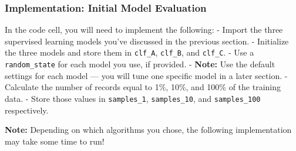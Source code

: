 \documentclass[11pt]{article}
\begin{document}
    \hypertarget{implementation-initial-model-evaluation}{%
\subsubsection{Implementation: Initial Model
Evaluation}\label{implementation-initial-model-evaluation}}

In the code cell, you will need to implement the following: - Import the
three supervised learning models you've discussed in the previous
section. - Initialize the three models and store them in
\texttt{\textquotesingle{}clf\_A\textquotesingle{}},
\texttt{\textquotesingle{}clf\_B\textquotesingle{}}, and
\texttt{\textquotesingle{}clf\_C\textquotesingle{}}. - Use a
\texttt{\textquotesingle{}random\_state\textquotesingle{}} for each
model you use, if provided. - \textbf{Note:} Use the default settings
for each model --- you will tune one specific model in a later section.
- Calculate the number of records equal to 1\%, 10\%, and 100\% of the
training data. - Store those values in
\texttt{\textquotesingle{}samples\_1\textquotesingle{}},
\texttt{\textquotesingle{}samples\_10\textquotesingle{}}, and
\texttt{\textquotesingle{}samples\_100\textquotesingle{}} respectively.

\textbf{Note:} Depending on which algorithms you chose, the following
implementation may take some time to run!
\end{document}
